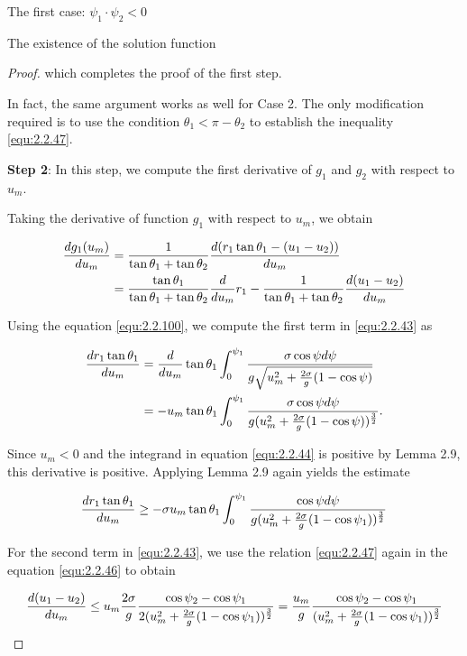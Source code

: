 \documentclass[letterpaper,reqno,10pt,twoside]{amsart}
\theoremstyle{definition}
\theoremstyle{remark}
\begin{document}
\begin{section}{The first case: $\psi_1\cdot \psi_2<0$ }
\begin{subsection}{The existence of the solution function}
\begin{proof}
  \noindent which completes the proof of the first step. 
  
  In fact, the same argument works as well for Case 2. The only modification required is to use the condition $\theta_1<\pi-\theta_2$ to establish the inequality \eqref{equ:2.2.47}.

  \textbf{Step 2}: In this step, we compute the first derivative of $g_1$ and $g_2$ with respect to $u_m$.
  
  Taking the derivative of function $g_1$ with respect to $u_{m}$, we obtain

  \begin{align}
      \frac{dg_1(u_{m})}{du_{m}}&=\frac{1}{\tan\theta_1+\tan\theta_2}\frac{d(r_1\tan\theta_1-(u_1-u_2))}{du_{m}} \notag\\
      &=\frac{\tan\theta_1}{\tan\theta_1+\tan\theta_2}\frac{d}{du_m}r_1-\frac{1}{\tan\theta_1+\tan\theta_2}\frac{d(u_1-u_2)}{du_m} \label{equ:2.2.43}
  \end{align}

   \noindent  Using the equation \eqref{equ:2.2.100}, we compute the first term in \eqref{equ:2.2.43} as

  \begin{align}
      \frac{dr_1\tan\theta_1}{du_{m}}&=\frac{d}{du_{m}}\tan\theta_1\int_{0}^{\psi_1}\frac{\sigma\cos\psi d\psi}{g\sqrt{u_{m}^{2}+\frac{2\sigma}{g}(1-\cos\psi)}}\notag \\
      &=-u_{m}\tan\theta_1\int_{0}^{\psi_1} \frac{\sigma\cos\psi d\psi}{{g(u_{m}^{2}+\frac{2\sigma}{g}(1-\cos\psi))^{\frac{3}{2}}}} \label{equ:2.2.44}.
  \end{align}

  \noindent Since $u_{m}<0$ and the integrand in equation \eqref{equ:2.2.44} is positive by Lemma 2.9, this derivative is positive. Applying Lemma 2.9 again yields the estimate
  
  \begin{equation}{\label{equ:2.2.45}}
      \frac{dr_1\tan\theta_1}{du_{m}}\geq -\sigma u_{m}\tan\theta_1\int_{0}^{\psi_1}\frac{\cos\psi d\psi}{{g(u_{m}^{2}+\frac{2\sigma}{g}(1-\cos\psi_1))^{\frac{3}{2}}}}
  \end{equation}

   For the second term in \eqref{equ:2.2.43}, we use the relation \eqref{equ:2.2.47} again in the equation \eqref{equ:2.2.46} to obtain

  \begin{equation}{\label{equ:2.2.48}}
       \frac{d(u_1-u_2)}{du_{m}}\leq u_m\frac{2\sigma}{g}\frac{\cos\psi_2-\cos\psi_1}{2(u_{m}^{2}+\frac{2\sigma}{g}(1-\cos\psi_1))^{\frac{3}{2}}}=\frac{u_{m}}{g}\frac{\cos\psi_2-\cos\psi_1}{(u_m^{2}+\frac{2\sigma}{g}(1-\cos\psi_1))^{\frac{3}{2}}}
  \end{equation}


\end{proof}
\end{subsection}
\end{section}
\end{document}
